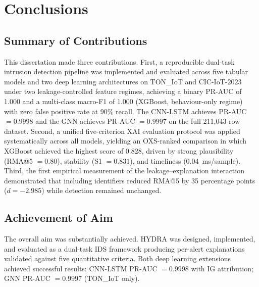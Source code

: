 \documentclass[12pt,a4paper]{report}
\begin{document}
\chapter{Conclusions}
\label{ch:conclusions}

\section{Summary of Contributions}
\label{sec:conclusion-contributions}

This dissertation made three contributions. First, a reproducible dual-task intrusion detection pipeline was implemented and evaluated across five tabular models and two deep learning architectures on TON\_IoT and CIC-IoT-2023 under two leakage-controlled feature regimes, achieving a binary PR-AUC of 1.000 and a multi-class macro-F1 of 1.000 (XGBoost, behaviour-only regime) with zero false positive rate at 90\% recall. The CNN-LSTM achieves PR-AUC $= 0.9998$ and the GNN achieves PR-AUC $= 0.9997$ on the full 211,043-row dataset. Second, a unified five-criterion XAI evaluation protocol was applied systematically across all models, yielding an OXS-ranked comparison in which XGBoost achieved the highest score of 0.828, driven by strong plausibility (RMA@5 $= 0.80$), stability (S1 $= 0.831$), and timeliness (0.04~ms/sample). Third, the first empirical measurement of the leakage--explanation interaction demonstrated that including identifiers reduced RMA@5 by 35 percentage points ($d = -2.985$) while detection remained unchanged.

\section{Achievement of Aim}
\label{sec:achievement}

The overall aim was substantially achieved. HYDRA was designed, implemented, and evaluated as a dual-task IDS framework producing per-alert explanations validated against five quantitative criteria. Both deep learning extensions achieved successful results: CNN-LSTM PR-AUC $= 0.9998$ with IG attribution; GNN PR-AUC $= 0.9997$ (TON\_IoT only).
\end{document}
